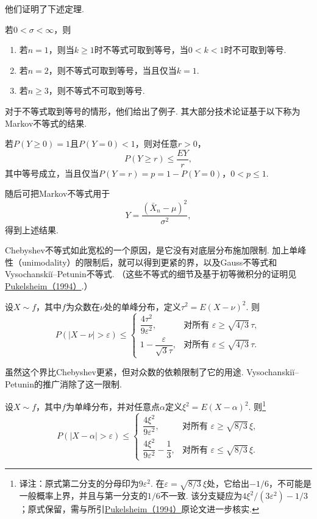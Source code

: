 他们证明了下述定理.

\begin{theorem}\label{thm:3.8.2}
若$0<\sigma<\infty$，则
\begin{enumerate}
\item[(a)] 若$n=1$，则当$k\ge1$时不等式可取到等号，当$0<k<1$时不可取到等号.
\item[(b)] 若$n=2$，则不等式可取到等号，当且仅当$k=1$.
\item[(c)] 若$n\ge3$，则不等式不可取到等号.
\end{enumerate}
\end{theorem}
对于不等式取到等号的情形，他们给出了例子. 其大部分技术论证基于以下称为Markov不等式的结果.

\begin{lemma}[Markov不等式]\label{lem:3.8.3}
若$P(Y\ge0)=1$且$P(Y=0)<1$，则对任意$r>0$，
$$P(Y\ge r)\le\frac{EY}r,$$
其中等号成立，当且仅当$P(Y=r)=p=1-P(Y=0)$，$0<p\le1$.
\end{lemma}
随后可把Markov不等式用于
$$Y=\frac{(\bar X_n-\mu)^2}{\sigma^2},$$
得到上述结果.

Chebyshev不等式如此宽松的一个原因，是它没有对底层分布施加限制. 加上单峰性（unimodality）的限制后，就可以得到更紧的界，以及Gauss不等式和Vysochanski\u{i}--Petunin不等式. （这些不等式的细节及基于初等微积分的证明见\mbox{\hyperref[bib:source248]{Pukelsheim（1994）}.）}

\begin{theorem}[Gauss不等式]\label{thm:3.8.4}
设$X\sim f$，其中$f$为众数在$\nu$处的单峰分布，定义$\tau^2=E(X-\nu)^2$. 则
$$P(|X-\nu|>\varepsilon)\le\begin{cases}\dfrac{4\tau^2}{9\varepsilon^2},&\text{对所有 }\varepsilon\ge\sqrt{4/3}\,\tau,\\[4pt]1-\dfrac\varepsilon{\sqrt3\tau},&\text{对所有 }\varepsilon\le\sqrt{4/3}\,\tau.\end{cases}$$
\end{theorem}
虽然这个界比Chebyshev更紧，但对众数的依赖限制了它的用途. Vysochanski\u{i}--Petunin的推广消除了这一限制.

\begin{theorem}\label{thm:3.8.5}
设$X\sim f$，其中$f$为单峰分布，并对任意点$\alpha$定义$\xi^2=E(X-\alpha)^2$. 则\footnote{译注：原式第二分支的分母印为$9\varepsilon^2$. 在$\varepsilon=\sqrt{8/3}\,\xi$处，它给出$-1/6$，不可能是一般概率上界，并且与第一分支的$1/6$不一致. 该分支疑应为$4\xi^2/(3\varepsilon^2)-1/3$；原式保留，需与所引\hyperref[bib:source248]{Pukelsheim（1994）}原论文进一步核实.}
$$P(|X-\alpha|>\varepsilon)\le\begin{cases}\dfrac{4\xi^2}{9\varepsilon^2},&\text{对所有 }\varepsilon\ge\sqrt{8/3}\,\xi,\\[4pt]\dfrac{4\xi^2}{9\varepsilon^2}-\dfrac13,&\text{对所有 }\varepsilon\le\sqrt{8/3}\,\xi.\end{cases}$$
\end{theorem}

